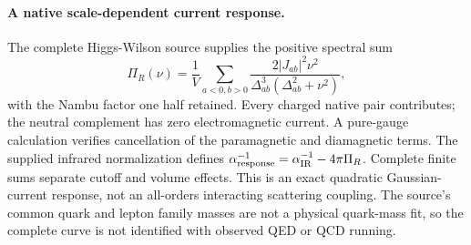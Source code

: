 \paragraph{A native scale-dependent current response.}
The complete Higgs-Wilson source supplies the positive spectral sum
\[
 \Pi_R(\nu)=\frac1{V}\sum_{a<0,b>0}
 \frac{2|J_{ab}|^2\nu^2}{\Delta_{ab}^3(\Delta_{ab}^2+\nu^2)},
\]
with the Nambu factor one half retained. Every charged native pair contributes;
the neutral complement has zero electromagnetic current. A pure-gauge
calculation verifies cancellation of the paramagnetic and diamagnetic
terms. The supplied infrared normalization defines
$\alpha_{\rm response}^{-1}=\alpha_{\rm IR}^{-1}-4\pi\Pi_R$.
Complete finite sums separate cutoff and volume effects. This is an exact
quadratic Gaussian-current response, not an all-orders interacting scattering
coupling. The source's common quark and lepton family masses are not a physical
quark-mass fit, so the complete curve is not identified with observed QED
or QCD running.
